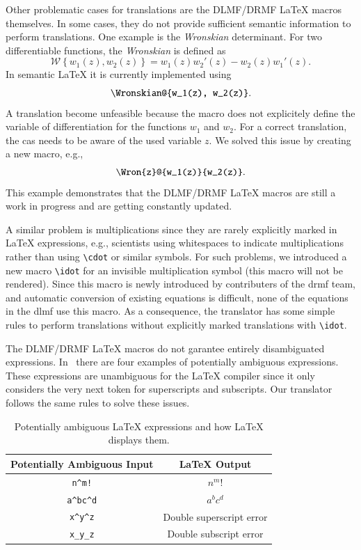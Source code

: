 \documentclass[a4paper,11pt]{article}
\newcommand{\DLMF}{DLMF}
\newcommand{\DRMF}{DRMF}
\newcommand{\Macro}{\DLMF/\DRMF{} \LaTeX{} macro}
\theoremstyle{defTheoStyle}
\theoremstyle{defExampStyle}
\begin{document}
Other problematic cases for translations are the \Macro s themselves. In some cases, they do not provide sufficient semantic information to perform translations. One example is the \textit{Wronskian} determinant. For two differentiable functions, the \textit{Wronskian} is defined as~\parencite[(1.13.4)]{NIST:DLMF}
\begin{equation*}
	\mathscr{W} \left\{ w_1(z), w_2(z) \right\} = w_1(z)w_2'(z) - w_2(z)w_1'(z).
\end{equation*}
In semantic \LaTeX{} it is currently implemented using
\begin{equation}
	\verb|\Wronskian@{w_1(z), w_2(z)}|.
\end{equation}
A translation become unfeasible because the macro does not explicitely define the variable of differentiation for the functions $w_1$ and $w_2$. For a correct translation, the \gls*{cas} needs to be aware of the used variable $z$. We solved this issue by creating a new macro, e.g.,
\begin{equation}
	\verb|\Wron{z}@{w_1(z)}{w_2(z)}|.
\end{equation}
This example demonstrates that the \Macro s are still a work in progress and are getting constantly updated.

A similar problem is multiplications since they are rarely explicitly marked in \LaTeX{} expressions, e.g., scientists using whitespaces to indicate multiplications rather than using \verb|\cdot| or similar symbols. For such problems, we introduced a new macro \verb|\idot| for an invisible multiplication symbol (this macro will not be rendered). Since this macro is newly introduced by contributers of the \gls*{drmf} team, and automatic conversion of existing equations is difficult, none of the equations in the \gls*{dlmf} use this macro. As a consequence, the translator has some simple rules to perform translations without explicitly marked translations with \verb|\idot|.

The \Macro s do not garantee entirely disambiguated expressions. In~ there are four examples of potentially ambiguous expressions. These expressions are unambiguous for the \LaTeX{} compiler since it only considers the very next token for superscripts and subscripts. Our translator follows the same rules to solve these issues.

\begin{table}[ht]
\centering
\begin{tabular}{cc}
	\hline
	Potentially Ambiguous Input & \LaTeX{} Output\\
	\hline
	\verb|n^m!| & $n^m!$\\
	\verb|a^bc^d| & $a^bc^d$\\
	\verb|x^y^z| & Double superscript error\\
	\verb|x_y_z| & Double subscript error\\
	\hline
\end{tabular}
\caption{Potentially ambiguous \LaTeX{} expressions and how \LaTeX{} displays them.}
\label{tab:amb-latex}
\end{table}
\end{document}
